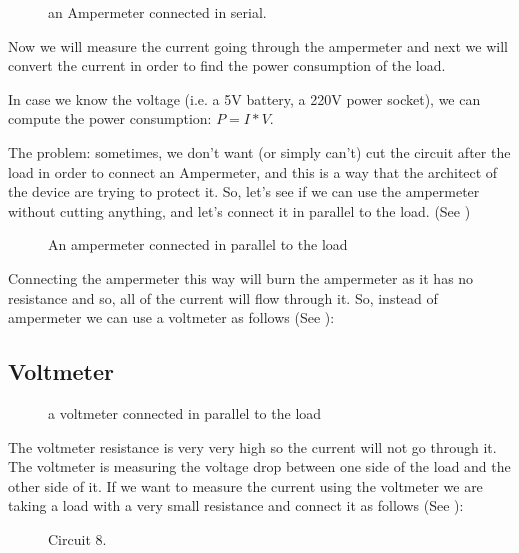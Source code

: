 \begin{figure}[!ht]
    \centering
    
    \caption{an Ampermeter connected in serial.} \label{fig:circuit5}
\end{figure}

Now we will measure the current going through the ampermeter and next we will
convert the current in order to find the power consumption of the load.

In case we know the voltage (i.e. a 5V battery, a 220V power socket), we can
compute the power consumption: $P=I*V$.

The problem: sometimes, we don't want (or simply can't) cut the circuit after
the load in order to connect an Ampermeter, and this is a way that the architect
of the device are trying to protect it. So, let's see if we can use the
ampermeter without cutting anything, and let's connect it in parallel to the
load. (See )

\begin{figure}[!ht]
    \centering
    
    \caption{An ampermeter connected in parallel to the load} \label{fig:circuit6}
\end{figure}

Connecting the ampermeter this way will burn the ampermeter as it has no
resistance and so, all of the current will flow through it. So, instead of
ampermeter we can use a voltmeter as follows (See ):

\subsection{Voltmeter}

\begin{figure}[!ht]
    \centering
    
    \caption{a voltmeter connected in parallel to the load} \label{fig:circuit7}
\end{figure}

The voltmeter resistance is very very high so the current will not go through
it. The voltmeter is measuring the voltage drop between one side of the load and
the other side of it. If we want to measure the current using the voltmeter we
are taking a load with a very small resistance and connect it as follows (See
):

\begin{figure}[!ht]
    \centering
    
    \caption{Circuit 8.} \label{fig:circuit8}
\end{figure}

